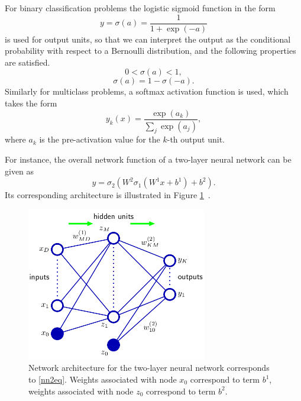 For binary classification problems the logistic sigmoid function in the form
\begin{equation}
	y = \sigma(a) = \frac{1}{1+\exp(-a)}
\end{equation}
is used for output units, so that we can interpret the output as the conditional probability with respect to a Bernoulli distribution, and the following properties are satisfied.
\begin{equation}
	0<\sigma(a)<1, 
\end{equation}
\begin{equation}
	\sigma(a) = 1-\sigma(-a). 
\end{equation}
Similarly for multiclass problems, a softmax activation function is used, which takes the form
\begin{equation}
	y_k(x) = \frac{\exp(a_k)}{\sum\nolimits_j \exp(a_j)},
\end{equation}
where $a_k$ is the pre-activation value for the $k$-th output unit.

For instance, the overall network function of a two-layer neural network can be given as 
\begin{equation}
	\label{nn2eq}
	y = \sigma_2(W^2\sigma_1(W^1x+b^1)+b^2).
\end{equation}
Its corresponding architecture is illustrated in Figure \ref{nnfig}~\cite{bishop2006pattern}.

\begin{figure}[h!]
  \centering
  \label{nnfig}
  \includegraphics[width=0.7\textwidth]{pics/nn.png}
  \caption{Network architecture for the two-layer neural network corresponds to \ref{nn2eq}. Weights associated with node $x_0$ correspond to term $b^1$, weights associated with node $z_0$ correspond to term $b^2$. }
\end{figure}

